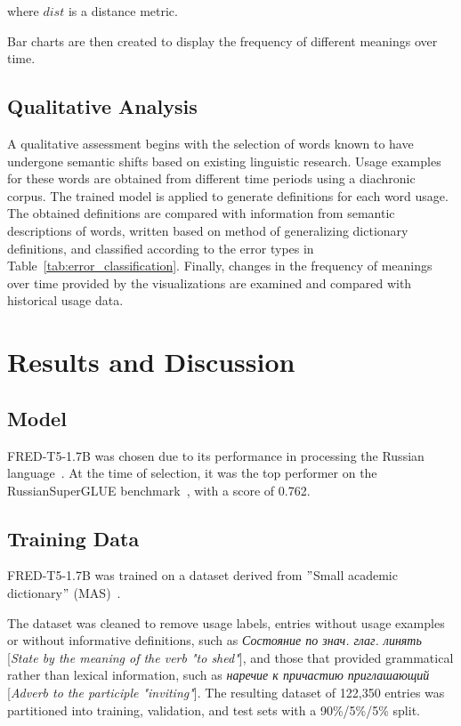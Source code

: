\documentclass[11pt]{article}
\begin{document}
where \( dist \) is a distance metric.

Bar charts are then created to display the frequency of different meanings over time.

\subsection{Qualitative Analysis}

A qualitative assessment begins with the selection of words known to have undergone semantic shifts based on existing linguistic research.
Usage examples for these words are obtained from different time periods using a diachronic corpus.
The trained model is applied to generate definitions for each word usage.
The obtained definitions are compared with information from semantic descriptions of words,
written based on  method of generalizing dictionary definitions,
and classified according to the error types in Table~\ref{tab:error_classification}.
Finally, changes in the frequency of meanings over time provided by the visualizations are examined and compared with historical usage data.

\section{Results and Discussion}\label{sec:results-and-discussion}

\subsection{Model}

FRED-T5-1.7B was chosen due to its performance in processing the Russian language~\cite{FRED-T5}.
At the time of selection, it was the top performer on the RussianSuperGLUE benchmark~\cite{RussianSuperGLUE}, with a score of 0.762.

\subsection{Training Data}\label{subsec:training-data}

FRED-T5-1.7B was trained on a dataset derived from \("\)Small academic dictionary\("\) (MAS)~\cite{MAS1981}.

The dataset was cleaned to remove usage labels, entries without usage examples or without informative definitions, such as \textit{Состояние по знач. глаг. линять} [\textit{State by the meaning of the verb "to shed"}],
and those that provided grammatical rather than lexical information, such as \textit{наречие к причастию приглашающий} [\textit{Adverb to the participle "inviting"}].
The resulting dataset of 122,350 entries was partitioned into training, validation, and test sets with a 90\%/5\%/5\% split.
\end{document}
